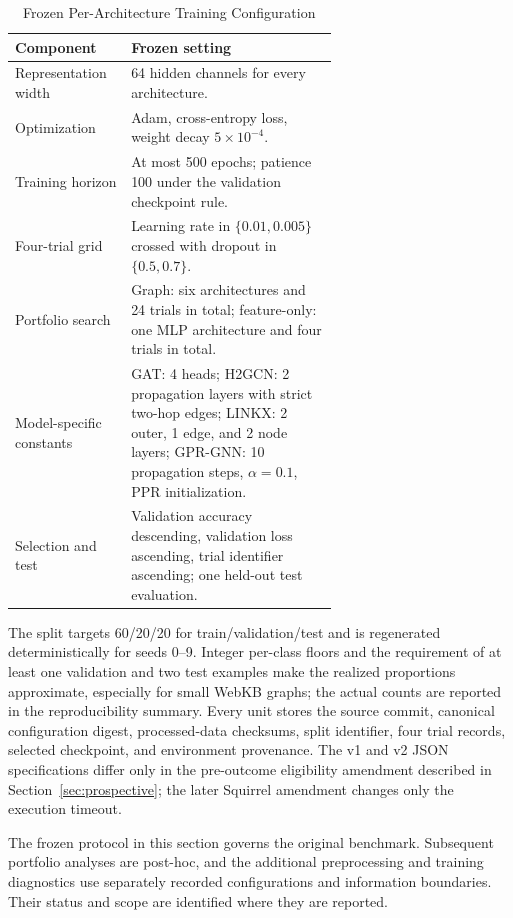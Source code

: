 \begin{table}[t]
\centering
\caption{Frozen Per-Architecture Training Configuration}
\label{tab:frozen_training}
\small
\begin{tabular}{@{}lp{0.64\linewidth}@{}}
\toprule
Component & Frozen setting \\
\midrule
Representation width & 64 hidden channels for every architecture. \\
Optimization & Adam, cross-entropy loss, weight decay $5\times 10^{-4}$. \\
Training horizon & At most 500 epochs; patience 100 under the validation checkpoint rule. \\
Four-trial grid & Learning rate in $\{0.01,0.005\}$ crossed with dropout in $\{0.5,0.7\}$. \\
Portfolio search & Graph: six architectures and 24 trials in total; feature-only: one MLP architecture and four trials in total. \\
Model-specific constants & GAT: 4 heads; H2GCN: 2 propagation layers with strict two-hop edges; LINKX: 2 outer, 1 edge, and 2 node layers; GPR-GNN: 10 propagation steps, $\alpha=0.1$, PPR initialization. \\
Selection and test & Validation accuracy descending, validation loss ascending, trial identifier ascending; one held-out test evaluation. \\
\bottomrule
\end{tabular}
\end{table}

The split targets 60/20/20 for train/validation/test and is regenerated deterministically for seeds 0--9. Integer per-class floors and the requirement of at least one validation and two test examples make the realized proportions approximate, especially for small WebKB graphs; the actual counts are reported in the reproducibility summary. Every unit stores the source commit, canonical configuration digest, processed-data checksums, split identifier, four trial records, selected checkpoint, and environment provenance. The v1 and v2 JSON specifications differ only in the pre-outcome eligibility amendment described in Section~\ref{sec:prospective}; the later Squirrel amendment changes only the execution timeout.

The frozen protocol in this section governs the original benchmark. Subsequent portfolio analyses are post-hoc, and the additional preprocessing and training diagnostics use separately recorded configurations and information boundaries. Their status and scope are identified where they are reported.

